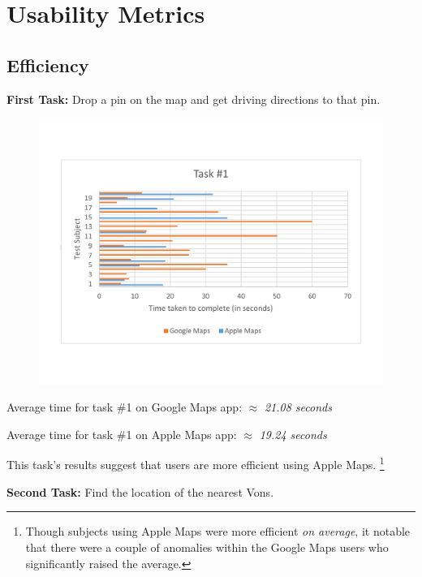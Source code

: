 \documentclass[a4paper; 11pt]{article}
\begin{document}
\section{Usability Metrics}
\subsection{Efficiency}
\par
\textbf{First Task: }Drop a pin on the map and get driving directions to that pin.
\vspace{-.4in}
\begin{figure}[ht]
\begin{center}
\vspace{-.1in}
\includegraphics[keepaspectratio, width=.8\textwidth ]{task1.pdf}
\end{center}
\end{figure}
\begin{center}
\vspace{-.6in}
\par
Average time for task \#1 on Google Maps app: $ \approx $ \textit{21.08 seconds}
\par
Average time for task \#1 on Apple Maps app: $ \approx $ \textit{19.24 seconds}
\end{center}
\par
\noindent
This task's results suggest that users are more efficient using Apple Maps. \footnote{Though subjects using Apple Maps were more efficient \textit{on average}, it notable that there were a couple of anomalies within the Google Maps users who significantly raised the average.}
\clearpage
\par
\noindent
\textbf{Second Task: }Find the location of the nearest Vons.
\end{document}
